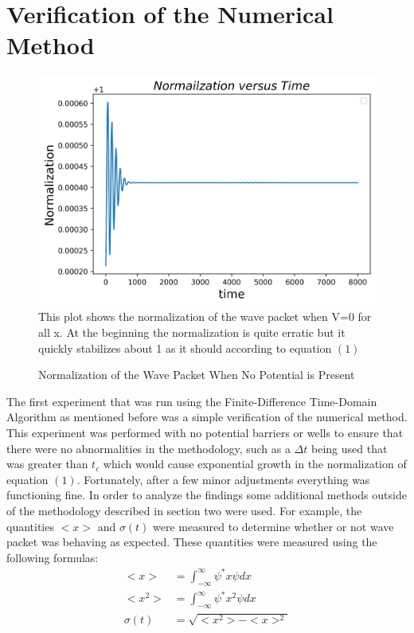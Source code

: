 \documentclass[twocolumn]{article}
\begin{document}
\section{Verification of the Numerical Method}
\begin{figure}[ht]
\centering
\caption{Normalization of the Wave Packet When No Potential is Present}
\includegraphics[scale=.5]{Norm1}
\small{This plot shows the normalization of the wave packet when V=0 for all x. At the beginning the normalization is quite erratic but it quickly stabilizes about 1 as it should according to equation $(1)$}
\end{figure}
\hspace{\parindent}The first experiment that was run using the Finite-Difference Time-Domain Algorithm as mentioned before was a simple verification of the numerical method. This experiment was performed with  no potential barriers or wells to ensure that there were no abnormalities in the methodology, such as a $\Delta t$ being used that was greater than $t_c$ which would cause exponential growth in the normalization of equation $(1)$. Fortunately, after a few minor adjustments everything was functioning fine. In order to analyze the findings some additional methods outside of the methodology described in section two were used. For example, the quantities $<x>$ and $\sigma(t)$ were measured to determine whether or not wave packet was behaving as expected. These quantities were measured using the following formulas:
\begin{align}
	<x>&=\int_{-\infty}^{\infty}\psi^*x\psi dx \\
	<x^2>&=\int_{-\infty}^{\infty}\psi^*x^2\psi dx \\
	\sigma(t)&=\sqrt{<x^2>-<x>^2}
\end{align}
\end{document}
